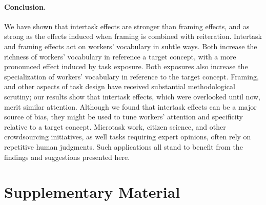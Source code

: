\documentclass[12pt]{article}
\begin{document}
\paragraph{Conclusion.}
We have shown that intertask effects are stronger than framing effects, and
as strong as the effects induced when framing is combined with reiteration.
Intertask and framing effects act on workers' vocabulary in subtle ways.  
Both increase the richness of workers' vocabulary in reference a target
concept, with a more pronounced effect induced by task exposure.
Both exposures also increase the specialization of workers' vocabulary in 
reference to the target concept.  Framing, and other aspects of task design 
have received substantial methodological scrutiny; our results show that 
intertask effects, which were overlooked until now, merit similar 
attention.  Although we found that intertask effects can be a major 
source of bias, they might be used to tune workers' attention and 
specificity relative to
a target concept.  Microtask work, citizen science, and other crowdsourcing
initiatives, as well tasks requiring expert opinions, often rely on repetitive
human judgments.  Such applications all stand to benefit from the 
findings and suggestions presented here.





\section*{Supplementary Material}
\end{document}

